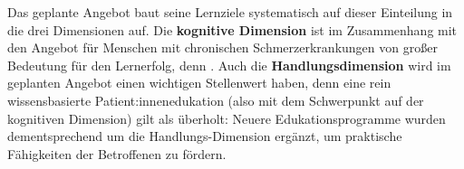 \documentclass[
  twoside,
  parskip=half-,
]{scrreprt}
\begin{document}
 \begin{praxis}
Das geplante Angebot baut seine Lernziele systematisch auf dieser Einteilung in die drei Dimensionen auf. Die \textbf{kognitive Dimension} ist im Zusammenhang mit den Angebot für Menschen mit chronischen Schmerzerkrankungen von großer Bedeutung für den Lernerfolg, denn . Auch die \textbf{Handlungsdimension} wird im geplanten Angebot einen wichtigen Stellenwert haben, denn eine rein wissensbasierte Patient:innenedukation (also mit dem Schwerpunkt auf der kognitiven Dimension) gilt als überholt: Neuere Edukationsprogramme wurden dementsprechend um die Handlungs-Dimension ergänzt, um praktische Fähigkeiten der Betroffenen zu fördern. 


\end{praxis}
\end{document}
